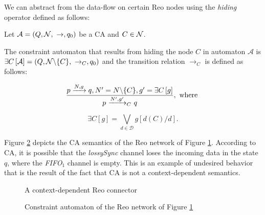 We can abstract from the data-flow on certain Reo nodes using the \emph{hiding} operator defined as follows:

\begin{definition}
 \label{def:cahid}
 Let $\mathcal{A}=(Q, \mathcal{N},\ \rightarrow, q_{0})$ be a CA and $C \in \mathcal{N}$. 
 
 The constraint automaton that results from hiding the node $C$ in automaton $\mathcal{A}$ is
$\exists C \left[\mathcal{A}\right] = (Q, \mathcal{N} \backslash \{C\},\ \rightarrow_C, q_{0})$ and the transition relation $\longrightarrow_C$ is defined as follows:

$$\dfrac{p\xrightarrow{N,g}q, N' = N \backslash \{C\}, g' = \exists C\left[g\right]}{p~ {\xrightarrow{N',g'}_{C}} ~q},\text{ where }$$ 

$$ \exists C \left[g\right] = \underset{d \in \mathcal{D}}{\bigvee} g\left[d\left(C\right)\slash d\right].$$
\end{definition}

\begin{BehExample}
\label{ex:contextsenmslnn}
Figure \ref{fig:calosfif} depicts the CA semantics of the Reo network of Figure \ref{fig:lossyfifo}. According to CA, it is possible that the \emph{lossySync} channel loses the incoming data in the state $q$,  where the \emph{FIFO$_1$} channel is empty. This is an example of undesired behavior that is the result of the fact that CA is not a context-dependent semantics. %

   \begin{figure}[!h]
   \mesallossyfif    
    \caption{A context-dependent Reo connector}
    \label{fig:lossyfifo}
   \end{figure}  
       \begin{figure}[!h]
\centering
   \vspace{.2cm}
    \caption[CA of Figure \ref{fig:lossyfifo}]{Constraint automaton of the Reo network of Figure \ref{fig:lossyfifo}}
\label{fig:calosfif}
\end{figure}

               
\end{BehExample}

